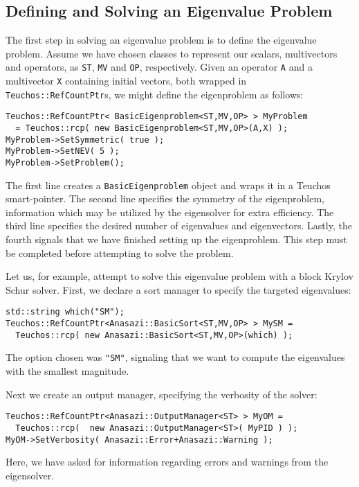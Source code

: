 \subsection{Defining and Solving an Eigenvalue Problem}
\label{sec:anasazi:example}

The first step in solving an eigenvalue problem is to define the eigenvalue
problem. Assume we have chosen classes to represent our scalars, multivectors
and operators, as \verb!ST!, \verb!MV! and \verb!OP!, respectively. Given an
operator \verb!A! and a multivector \verb!X! containing initial vectors, both
wrapped in \verb!Teuchos::RefCountPtr!s, we might define the eigenproblem as
follows:
\begin{verbatim}
Teuchos::RefCountPtr< BasicEigenproblem<ST,MV,OP> > MyProblem 
  = Teuchos::rcp( new BasicEigenproblem<ST,MV,OP>(A,X) );
MyProblem->SetSymmetric( true );
MyProblem->SetNEV( 5 );
MyProblem->SetProblem();
\end{verbatim}

The first line creates a \verb!BasicEigenproblem! object and wraps it
in a Teuchos smart-pointer. The second line specifies the symmetry of
the eigenproblem, information which may be utilized by the eigensolver
for extra efficiency. The third line specifies the desired number of
eigenvalues and eigenvectors. Lastly, the fourth signals that we have
finished setting up the eigenproblem. This step must be completed
before attempting to solve the problem.

Let us, for example, attempt to solve this eigenvalue problem with a
block Krylov Schur solver. First, we declare a sort manager to specify the
targeted eigenvalues:
\begin{verbatim}
std::string which("SM");
Teuchos::RefCountPtr<Anasazi::BasicSort<ST,MV,OP> > MySM =
  Teuchos::rcp( new Anasazi::BasicSort<ST,MV,OP>(which) );
\end{verbatim}
The option chosen was \verb!"SM"!, signaling that we want to compute
the eigenvalues with the smallest magnitude. 

Next we create an output manager, specifying the verbosity of the
solver:
\begin{verbatim}
Teuchos::RefCountPtr<Anasazi::OutputManager<ST> > MyOM = 
  Teuchos::rcp(  new Anasazi::OutputManager<ST>( MyPID ) );
MyOM->SetVerbosity( Anasazi::Error+Anasazi::Warning );
\end{verbatim}
Here, we have asked for information regarding errors and warnings from
the eigensolver.


